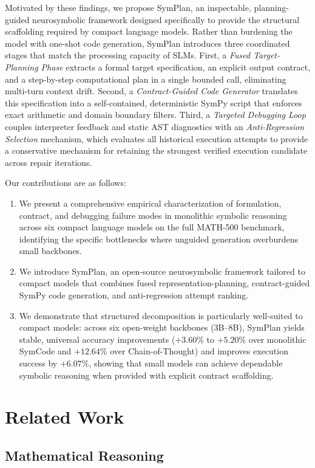 \documentclass[conference,a4paper]{IEEEtran}
\begin{document}
Motivated by these findings, we propose SymPlan, an inspectable, planning-guided neurosymbolic framework designed specifically to provide the structural scaffolding required by compact language models. Rather than burdening the model with one-shot code generation, SymPlan introduces three coordinated stages that match the processing capacity of SLMs. First, a \textit{Fused Target-Planning Phase} extracts a formal target specification, an explicit output contract, and a step-by-step computational plan in a single bounded call, eliminating multi-turn context drift. Second, a \textit{Contract-Guided Code Generator} translates this specification into a self-contained, deterministic SymPy script that enforces exact arithmetic and domain boundary filters. Third, a \textit{Targeted Debugging Loop} couples interpreter feedback and static AST diagnostics with an \textit{Anti-Regression Selection} mechanism, which evaluates all historical execution attempts to provide a conservative mechanism for retaining the strongest verified execution candidate across repair iterations.

Our contributions are as follows:
\begin{enumerate}
    \item We present a comprehensive empirical characterization of formulation, contract, and debugging failure modes in monolithic symbolic reasoning across six compact language models on the full MATH-500 benchmark, identifying the specific bottlenecks where unguided generation overburdens small backbones.
    \item We introduce SymPlan, an open-source neurosymbolic framework tailored to compact models that combines fused representation-planning, contract-guided SymPy code generation, and anti-regression attempt ranking.
    \item We demonstrate that structured decomposition is particularly well-suited to compact models: across six open-weight backbones (3B--8B), SymPlan yields stable, universal accuracy improvements ($+3.60\%$ to $+5.20\%$ over monolithic SymCode and $+12.64\%$ over Chain-of-Thought) and improves execution success by $+6.07\%$, showing that small models can achieve dependable symbolic reasoning when provided with explicit contract scaffolding.
\end{enumerate}
\section{Related Work}

\subsection{Mathematical Reasoning}
\end{document}
